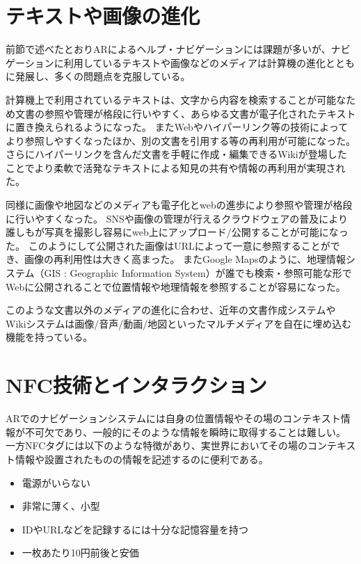 \section{テキストや画像の進化}
前節で述べたとおりARによるヘルプ・ナビゲーションには課題が多いが、ナビゲーションに利用しているテキストや画像などのメディアは計算機の進化とともに発展し、多くの問題点を克服している。

計算機上で利用されているテキストは、文字から内容を検索することが可能なため文書の参照や管理が格段に行いやすく、あらゆる文書が電子化されたテキストに置き換えられるようになった。
またWebやハイパーリンク等の技術によってより参照しやすくなったほか、別の文書を引用する等の再利用が可能になった。
さらにハイパーリンクを含んだ文書を手軽に作成・編集できるWiki\cite{Leuf2001TheWW}が登場したことでより柔軟で活発なテキストによる知見の共有や情報の再利用が実現された。

同様に画像や地図などのメディアも電子化とwebの進歩により参照や管理が格段に行いやすくなった。
SNSや画像の管理が行えるクラウドウェアの普及により誰しもが写真を撮影し容易にweb上にアップロード/公開することが可能になった。
このようにして公開された画像はURLによって一意に参照することができ、画像の再利用性は大きく高まった。
またGoogle Mapsのように、地理情報システム（GIS : Geographic Information System）が誰でも検索・参照可能な形でWebに公開されることで位置情報や地理情報を参照することが容易になった。

このような文書以外のメディアの進化に合わせ、近年の文書作成システムやWikiシステムは画像/音声/動画/地図といったマルチメディアを自在に埋め込む機能を持っている。



\section{NFC技術とインタラクション}
ARでのナビゲーションシステムには自身の位置情報やその場のコンテキスト情報が不可欠であり、一般的にそのような情報を瞬時に取得することは難しい。
一方NFCタグには以下のような特徴があり、実世界においてその場のコンテキスト情報や設置されたものの情報を記述するのに便利である。

\begin{itemize}
  \item 電源がいらない
  \item 非常に薄く、小型
  \item IDやURLなどを記録するには十分な記憶容量を持つ
  \item 一枚あたり10円前後と安価
\end{itemize}

